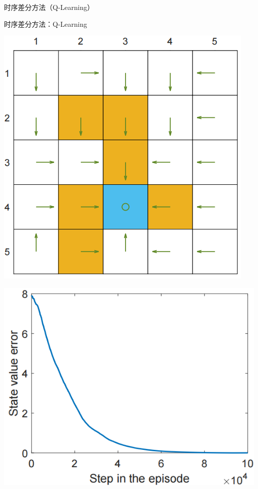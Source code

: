 \begin{section}{时序差分方法\alert{（Q-Learning）}}
\begin{frame}{时序差分方法：Q-Learning}
\begin{center}
\begin{minipage}{0.2\textwidth}
        \end{minipage}
        \hspace{1cm}
        \begin{minipage}{0.2\textwidth}
            \centering
            \includegraphics[width=\linewidth]{assets/e1qpolicy.jpg}
        \end{minipage}
        \hspace{1cm}
        \begin{minipage}{0.2\textwidth}
            \centering
            \includegraphics[width=\linewidth]{assets/e1statevalueerror.jpg}
        \end{minipage}
    \end{center}
\end{frame}


\end{section}
